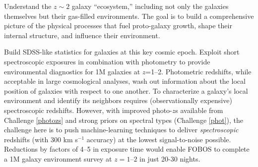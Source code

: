 
Understand the $z \sim 2$ galaxy ``ecosystem,'' including not only
the galaxies themselves but their gas-filled environments. The goal
is to build a comprehensive picture of the physical processes that
fuel proto-galaxy growth, shape their internal structure, and
influence their environment.

\noindent{} Build SDSS-like statistics for galaxies at
this key cosmic epoch. Exploit short spectroscopic exposures in
combination with photometry to provide environmental diagnostics for
1M galaxies at $z$=1--2. Photometric redshifts, while acceptable in
large cosmological analyses, wash out information about the local
position of galaxies with respect to one another. To characterize a
galaxy's local environment and identify its neighbors requires
(observationally expensive) spectroscopic redshifts. However, with
improved photo-$z$s available from Challenge \ref{photozs} and strong
priors on spectral types (Challenge \ref{phot}), the challenge here
is to push machine-learning techniques to deliver
\emph{spectroscopic} redshifts (with 300 km s$^{-1}$ accuracy) at the
lowest signal-to-noise possible. Reductions by factors of 4--5 in
exposure time would enable FOBOS to complete a 1M galaxy environment
survey at $z=1$--$2$ in just 20-30 nights.

\noindent{}

\noindent{}

\noindent{}

